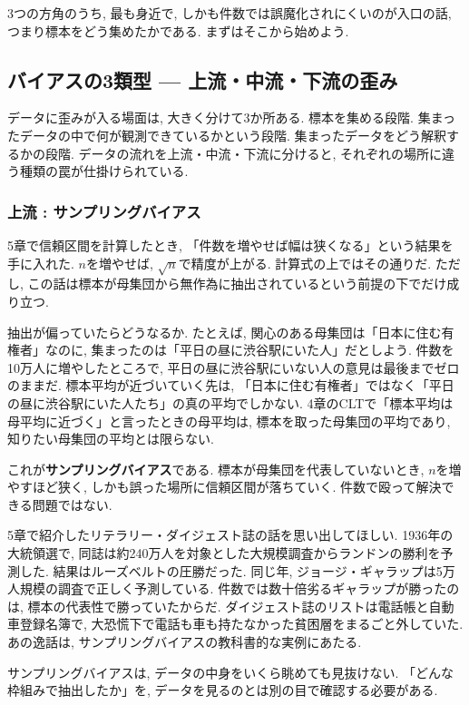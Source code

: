 3つの方角のうち, 最も身近で, しかも件数では誤魔化されにくいのが入口の話, つまり標本をどう集めたかである. まずはそこから始めよう.


\subsection{バイアスの3類型 — 上流・中流・下流の歪み}

データに歪みが入る場面は, 大きく分けて3か所ある.
標本を集める段階. 集まったデータの中で何が観測できているかという段階. 集まったデータをどう解釈するかの段階.
データの流れを上流・中流・下流に分けると, それぞれの場所に違う種類の罠が仕掛けられている.

\subsubsection*{上流 : サンプリングバイアス}

5章で信頼区間を計算したとき, 「件数を増やせば幅は狭くなる」という結果を手に入れた.
$n$を増やせば, $\sqrt{n}$で精度が上がる. 計算式の上ではその通りだ.
ただし, この話は標本が母集団から無作為に抽出されているという前提の下でだけ成り立つ.

抽出が偏っていたらどうなるか.
たとえば, 関心のある母集団は「日本に住む有権者」なのに, 集まったのは「平日の昼に渋谷駅にいた人」だとしよう.
件数を10万人に増やしたところで, 平日の昼に渋谷駅にいない人の意見は最後までゼロのままだ.
標本平均が近づいていく先は, 「日本に住む有権者」ではなく「平日の昼に渋谷駅にいた人たち」の真の平均でしかない.
4章のCLTで「標本平均は母平均に近づく」と言ったときの母平均は, 標本を取った母集団の平均であり, 知りたい母集団の平均とは限らない.

これが\textbf{サンプリングバイアス}である.
標本が母集団を代表していないとき, $n$を増やすほど狭く, しかも誤った場所に信頼区間が落ちていく.
件数で殴って解決できる問題ではない.

5章で紹介したリテラリー・ダイジェスト誌の話を思い出してほしい.
1936年の大統領選で, 同誌は約240万人を対象とした大規模調査からランドンの勝利を予測した.
結果はルーズベルトの圧勝だった. 同じ年, ジョージ・ギャラップは5万人規模の調査で正しく予測している.
件数では数十倍劣るギャラップが勝ったのは, 標本の代表性で勝っていたからだ.
ダイジェスト誌のリストは電話帳と自動車登録名簿で, 大恐慌下で電話も車も持たなかった貧困層をまるごと外していた.
あの逸話は, サンプリングバイアスの教科書的な実例にあたる.

サンプリングバイアスは, データの中身をいくら眺めても見抜けない.
「どんな枠組みで抽出したか」を, データを見るのとは別の目で確認する必要がある.

